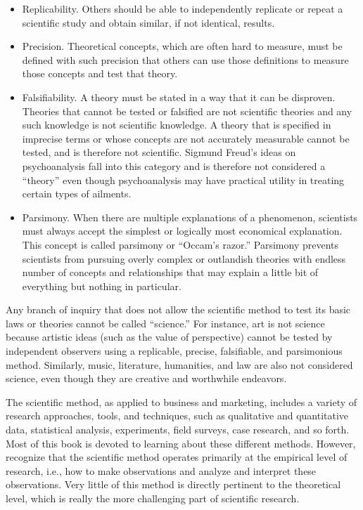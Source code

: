 \documentclass[]{book}
\theoremstyle{definition}
\theoremstyle{definition}
\theoremstyle{definition}
\theoremstyle{remark}
\begin{document}
\begin{itemize}
\item
  Replicability. Others should be able to independently replicate or
  repeat a scientific study and obtain similar, if not identical,
  results.
\item
  Precision. Theoretical concepts, which are often hard to measure, must
  be defined with such precision that others can use those definitions
  to measure those concepts and test that theory.
\item
  Falsifiability. A theory must be stated in a way that it can be
  disproven. Theories that cannot be tested or falsified are not
  scientific theories and any such knowledge is not scientific
  knowledge. A theory that is specified in imprecise terms or whose
  concepts are not accurately measurable cannot be tested, and is
  therefore not scientific. Sigmund Freud's ideas on psychoanalysis fall
  into this category and is therefore not considered a ``theory'' even
  though psychoanalysis may have practical utility in treating certain
  types of ailments.
\item
  Parsimony. When there are multiple explanations of a phenomenon,
  scientists must always accept the simplest or logically most
  economical explanation. This concept is called parsimony or ``Occam's
  razor.'' Parsimony prevents scientists from pursuing overly complex or
  outlandish theories with endless number of concepts and relationships
  that may explain a little bit of everything but nothing in particular.
\end{itemize}

Any branch of inquiry that does not allow the scientific method to test
its basic laws or theories cannot be called ``science.'' For instance,
art is not science because artistic ideas (such as the value of
perspective) cannot be tested by independent observers using a
replicable, precise, falsifiable, and parsimonious method. Similarly,
music, literature, humanities, and law are also not considered science,
even though they are creative and worthwhile endeavors.

The scientific method, as applied to business and marketing, includes a
variety of research approaches, tools, and techniques, such as
qualitative and quantitative data, statistical analysis, experiments,
field surveys, case research, and so forth. Most of this book is devoted
to learning about these different methods. However, recognize that the
scientific method operates primarily at the empirical level of research,
i.e., how to make observations and analyze and interpret these
observations. Very little of this method is directly pertinent to the
theoretical level, which is really the more challenging part of
scientific research.
\end{document}
